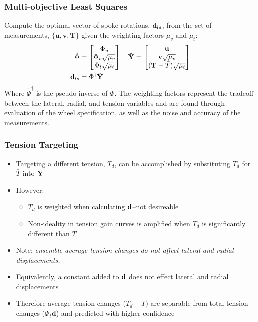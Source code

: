 \documentclass[mathserif]{beamer}
\begin{document}
\begin{frame}
\frametitle{Multi-objective Least Squares}
Compute the optimal vector of spoke rotations, ${\bf d}_{ls}$, from the set of measurements, $\{ \mathbf {u,v,T} \} $ given the weighting factors $\mu_v \text{ and }\mu_t$:
    \begin{align*}
    \tilde \Phi &= \begin{bmatrix}
    \Phi_u\\
    \Phi_v \sqrt {\mu_v}\\
    \Phi_t \sqrt {\mu_t}
    \end{bmatrix} \quad
    \bf \tilde Y = \begin{bmatrix}
    \mathbf {u} \\
   \mathbf {v}  \sqrt {\mu_v}\\
    ( {\bf  T} - \bar T )  \sqrt {\mu_t}
    \end{bmatrix}  \\
        {\bf d}_{ls} &= \tilde \Phi^\dagger {\bf \tilde Y}
    \end{align*}
	Where $\tilde \Phi^\dagger$ is the pseudo-inverse of $\tilde \Phi$.  The weighting factors represent the tradeoff between the lateral, radial, and tension variables and are found through evaluation of the wheel specification, as well as the noise and accuracy of the measurements.
\end{frame}

\begin{frame}
        \frametitle{Tension Targeting}
        \begin{itemize}
          \item Targeting a different tension, $T_d$, can be accomplished by substituting $T_d$ for $\bar T$ into $\bf Y$
          \item However:
          \begin{itemize}
              \item $T_d$ is weighted when calculating $\bf d$--not desireable
              \item Non-ideality in tension gain curves is amplified when $T_d$ is significantly different than $\bar T$
          \end{itemize}
          \item Note: \emph {ensemble average tension changes do not affect lateral and radial displacements.} 
          \item Equivalently, a constant added to $\bf d$ does not effect lateral and radial displacements
          \item Therefore average tension changes ($T_d - \bar T$) are separable from total tension changes ($\Phi_t \mathbf {d}$) and predicted with higher confidence 
        \end{itemize}
\end{frame}
        
\end{document}

